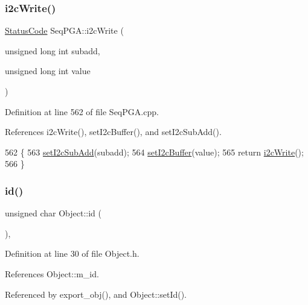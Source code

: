 \subsubsection{\texorpdfstring{i2c\+Write()}{i2cWrite()}\hspace{0.1cm}{\footnotesize\ttfamily [2/2]}}
{\footnotesize\ttfamily \hyperlink{classStatusCode}{Status\+Code} Seq\+P\+G\+A\+::i2c\+Write (\begin{DoxyParamCaption}\item[{unsigned long int}]{subadd,  }\item[{unsigned long int}]{value }\end{DoxyParamCaption})}



Definition at line 562 of file Seq\+P\+G\+A.\+cpp.



References i2c\+Write(), set\+I2c\+Buffer(), and set\+I2c\+Sub\+Add().


\begin{DoxyCode}
562                                                                             \{
563   \hyperlink{classSeqPGA_a348c5d982223fb5cf2878e5bf3c6429c}{setI2cSubAdd}(subadd);
564   \hyperlink{classSeqPGA_ab93beca49a31c1f9fddc915e9efeeaa0}{setI2cBuffer}(value);
565   \textcolor{keywordflow}{return} \hyperlink{classSeqPGA_a429076ca3a4ece94182bd95c623bb9d0}{i2cWrite}();
566 \}
\end{DoxyCode}
\mbox{\label{classObject_af99145335cc61ff6e2798ea17db009d2}} 
\subsubsection{\texorpdfstring{id()}{id()}}
{\footnotesize\ttfamily unsigned char Object\+::id (\begin{DoxyParamCaption}{ }\end{DoxyParamCaption})\hspace{0.3cm}{\ttfamily [inline]}, {\ttfamily [inherited]}}



Definition at line 30 of file Object.\+h.



References Object\+::m\+\_\+id.



Referenced by export\+\_\+obj(), and Object\+::set\+Id().


